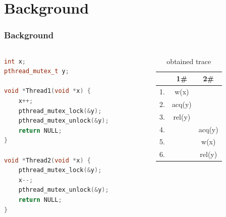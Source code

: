 \documentclass[xcolor=dvipsnames]{beamer}
\begin{document}
	\section{Background}
		\begin{frame}[fragile]
			\frametitle{Background}
			\begin{columns}
				\begin{column}{0.6\textwidth}
				\begin{lstlisting}[caption={program exhibiting a data race},language=C++]
int x;
pthread_mutex_t y;

void *Thread1(void *x) {
	x++;
	pthread_mutex_lock(&y);
	pthread_mutex_unlock(&y);
	return NULL;
}

void *Thread2(void *x) {
	pthread_mutex_lock(&y);
	x--;
	pthread_mutex_unlock(&y);
	return NULL;
}
				\end{lstlisting}
				\end{column}
				\pause
				\begin{column}{0.4\textwidth}
					\begin{table}
						\begin{center}
							\begin{tabular}{ c c c}
								& 1\# & 2\# \\
								\hline
								1. & w(x) & \\
								2. & acq(y) & \\
								3. & rel(y) & \\
								4. & & acq(y) \\
								5. & & w(x) \\
								6. & & rel(y) \\
							\end{tabular}
						\caption{obtained trace}
						\label{trace1}
						\end{center}
					\end{table}
				\end{column}
			\end{columns}
			
		\end{frame}
	
\end{document}
